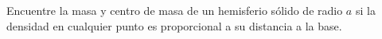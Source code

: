 \item Encuentre la masa y centro de masa de un hemisferio sólido de radio $a$ si la densidad en cualquier punto es proporcional a su distancia a la base.
